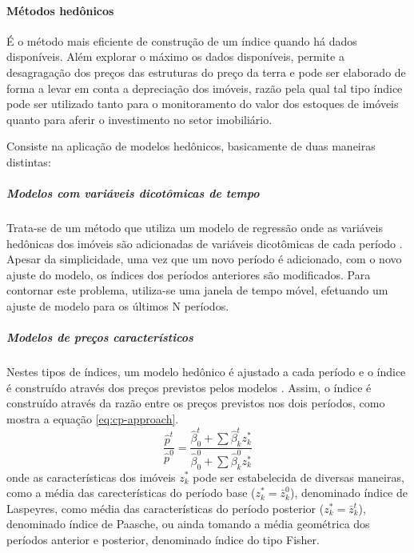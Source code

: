 \documentclass[
	12pt,				%
	oneside,			%
	a4paper,			%
	chapter=TITLE,		%
	section=TITLE,		%
	english,			%
	brazil				%
	]{abntex2}
\begin{document}
\paragraph{Métodos hedônicos}\label{muxe9todos-heduxf4nicos}

É o método mais eficiente de construção de um índice quando há dados
disponíveis. Além explorar o máximo os dados disponíveis, permite a
desagragação dos preços das estruturas do preço da terra e pode ser
elaborado de forma a levar em conta a depreciação dos imóveis, razão
pela qual tal tipo índice pode ser utilizado tanto para o monitoramento
do valor dos estoques de imóveis quanto para aferir o investimento no
setor imobiliário.

Consiste na aplicação de modelos hedônicos, basicamente de duas maneiras
distintas:

\subparagraph{Modelos com variáveis dicotômicas de
tempo}\label{modelos-com-variuxe1veis-dicotuxf4micas-de-tempo}

Trata-se de um método que utiliza um modelo de regressão onde as
variáveis hedônicas dos imóveis são adicionadas de variáveis dicotômicas
de cada período \autocite[158]{rppi}. Apesar da simplicidade, uma vez
que um novo período é adicionado, com o novo ajuste do modelo, os
índices dos períodos anteriores são modificados. Para contornar este
problema, utiliza-se uma janela de tempo móvel, efetuando um ajuste de
modelo para os últimos N períodos.

\subparagraph{Modelos de preços
característicos}\label{modelos-de-preuxe7os-caracteruxedsticos}

Nestes tipos de índices, um modelo hedônico é ajustado a cada período e
o índice é construído através dos preços previstos pelos modelos
\autocite[53]{rppi}. Assim, o índice é construído através da razão entre
os preços previstos nos dois períodos, como mostra a equação
\eqref{eq:cp-approach}.
\begin{equation}
\frac{\hat p^t}{\hat p^0} = \frac{\hat \beta_0^t + \sum \hat \beta_k^t z_k^*}{\hat \beta_0^0 + \sum \hat \beta_k^0 z_k^*}
\label{eq:cp-approach}
\end{equation}
onde as características dos imóveis \(z_k^*\) pode ser estabelecida de
diversas maneiras, como a média das carecterísticas do período base
(\(z_k^* = \bar z_k^0\)), denominado índice de Laspeyres, como média das
características do período posterior (\(z_k^* = \bar z_k^t\)),
denominado índice de Paasche, ou ainda tomando a média geométrica dos
períodos anterior e posterior, denominado índice do tipo Fisher.
\end{document}
